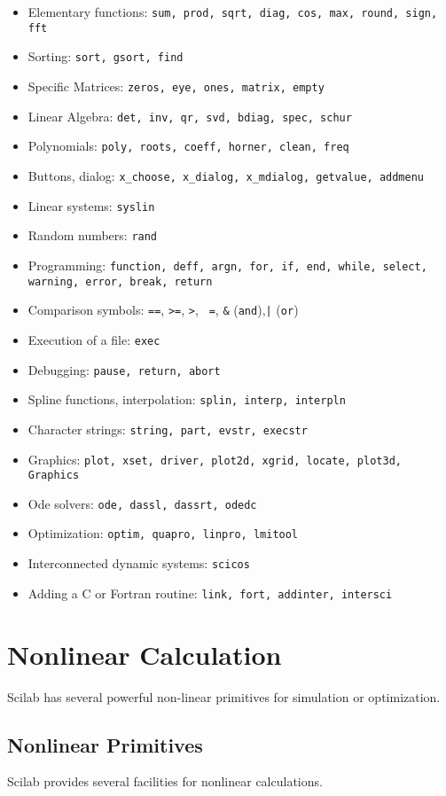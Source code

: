 \begin{itemize}
\item{Elementary functions: {\tt sum, prod, sqrt, diag, cos, max, round, sign, fft}}
\item{Sorting: {\tt sort, gsort, find}}
\item{Specific Matrices: {\tt zeros, eye, ones, matrix, empty}}
\item{Linear Algebra: {\tt det, inv, qr, svd, bdiag, spec, schur}}
\item{Polynomials}: {\tt poly, roots, coeff, horner, clean, freq}
\item{Buttons, dialog: \verb!x_choose, x_dialog, x_mdialog, getvalue, addmenu!}
\item{Linear systems: {\tt syslin}}
\item{Random numbers: {\tt rand}}
\item{Programming: {\tt function, deff, argn, for, if, end, while, select,
warning, error, break, return}}
\item{Comparison symbols: {\tt ==}, {\tt >=}, {\tt >}, {\tt ~=}, {\verb!&!}
({\tt and}),{\tt |} ({\tt or})}
\item{Execution of a file: {\tt exec}}
\item{Debugging: {\tt pause, return, abort}}
\item{Spline functions, interpolation: {\tt splin, interp, interpln}}
\item{Character strings: {\tt string, part, evstr, execstr}}
\item{Graphics: {\tt plot, xset, driver, plot2d, xgrid, locate, plot3d, Graphics}}
\item{Ode solvers: {\tt ode, dassl, dassrt, odedc}}
\item{Optimization: {\tt optim, quapro, linpro, lmitool}}
\item{Interconnected dynamic systems: {\tt scicos}}
\item{Adding a C or Fortran routine: {\tt link, fort, addinter, intersci}}
\end{itemize}


\section{Nonlinear Calculation}
\label{ch6}

	Scilab has several powerful non-linear primitives for simulation
or optimization.
\subsection{Nonlinear Primitives}
Scilab provides several facilities for nonlinear calculations.

